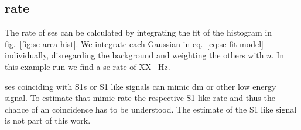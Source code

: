 
\FloatBarrier
\subsection{rate}
\label{ssec:rate}
\FloatBarrier


The rate of \glspl{se} can be calculated by integrating the fit of the histogram in fig.~\ref{fig:se-area-hist}.
We integrate each Gaussian in eq.~\ref{eq:se-fit-model} individually, disregarding the background and weighting the others with $ n $.
In this example run we find a \gls{se} rate of XX \SI{}{\hertz}.

\glspl{se} coinciding with S1s or S1 like signals can mimic \gls{dm} or other low energy signal.
To estimate that mimic rate the respective S1-like rate and thus the chance of an coincidence has to be understood.
The estimate of the S1 like signal is not part of this work.







